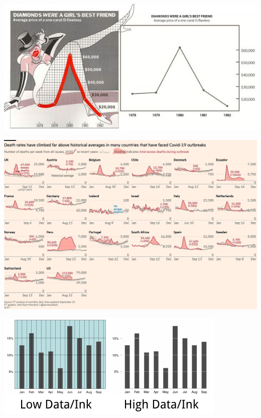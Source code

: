 \documentclass[xcolor=table,aspectratio=169]{beamer}
\begin{document}
\begin{frame}
  \includegraphics[width=\textwidth]{pics/junk-diamonds.jpg}
\end{frame}

\begin{frame}
	\includegraphics[height=\textheight]{pics/coronavirus_ft.png}
\end{frame}

\begin{frame}
  \includegraphics[width=\textwidth]{pics/dataink.png}
\end{frame}
\end{document}
